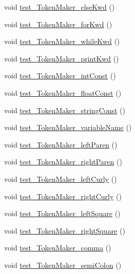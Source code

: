 \begin{DoxyCompactItemize}
\item 
void \hyperlink{classScannerTestSuite_a7e792719bac6501f55d4e89062d7fa0a}{test\-\_\-\-Token\-Maker\-\_\-else\-Kwd} ()
\item 
void \hyperlink{classScannerTestSuite_a977f0363e656db5a6df719e4f8e23fd5}{test\-\_\-\-Token\-Maker\-\_\-for\-Kwd} ()
\item 
void \hyperlink{classScannerTestSuite_a62a89711aa63f71870920fc36a40ab12}{test\-\_\-\-Token\-Maker\-\_\-while\-Kwd} ()
\item 
void \hyperlink{classScannerTestSuite_a8f5ccd7ff477d6ee966ae20f1c5f161c}{test\-\_\-\-Token\-Maker\-\_\-print\-Kwd} ()
\item 
void \hyperlink{classScannerTestSuite_a5c8d37b6b446f99846356d19ccb9ed05}{test\-\_\-\-Token\-Maker\-\_\-int\-Const} ()
\item 
void \hyperlink{classScannerTestSuite_ae3e0058aa6e11470871480461fa2b058}{test\-\_\-\-Token\-Maker\-\_\-float\-Const} ()
\item 
void \hyperlink{classScannerTestSuite_a6e95f7c63efa9f7ce519ec2cf557a28d}{test\-\_\-\-Token\-Maker\-\_\-string\-Const} ()
\item 
void \hyperlink{classScannerTestSuite_af1ebd344911a7fe6065d8bc0f3f53332}{test\-\_\-\-Token\-Maker\-\_\-variable\-Name} ()
\item 
void \hyperlink{classScannerTestSuite_a3edc932ed34df7d3f8cf6cefa2da7a00}{test\-\_\-\-Token\-Maker\-\_\-left\-Paren} ()
\item 
void \hyperlink{classScannerTestSuite_a8e2286c9ba583a40de686a6457577fb1}{test\-\_\-\-Token\-Maker\-\_\-right\-Paren} ()
\item 
void \hyperlink{classScannerTestSuite_a95383cf61a7b55366944fae7147a6dc1}{test\-\_\-\-Token\-Maker\-\_\-left\-Curly} ()
\item 
void \hyperlink{classScannerTestSuite_a844dd609d8a4a89eb128b6634a87107b}{test\-\_\-\-Token\-Maker\-\_\-right\-Curly} ()
\item 
void \hyperlink{classScannerTestSuite_a45b4775dab8fb8d6ca3b6a3b3b53057c}{test\-\_\-\-Token\-Maker\-\_\-left\-Square} ()
\item 
void \hyperlink{classScannerTestSuite_ad1bea3188d5ce34f693787fb8a963f55}{test\-\_\-\-Token\-Maker\-\_\-right\-Square} ()
\item 
void \hyperlink{classScannerTestSuite_a0dadcabb232c6fb73a3bf6f98a6f673b}{test\-\_\-\-Token\-Maker\-\_\-comma} ()
\item 
void \hyperlink{classScannerTestSuite_ae8bb85e64c0713bc6e37d67ec66407a9}{test\-\_\-\-Token\-Maker\-\_\-semi\-Colon} ()

\end{DoxyCompactItemize}
